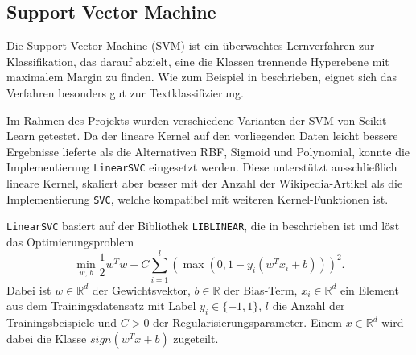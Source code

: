 \subsection{Support Vector Machine}
\label{SVM}

Die Support Vector Machine (SVM) ist ein überwachtes Lernverfahren zur Klassifikation, das darauf abzielt, eine die Klassen trennende Hyperebene mit maximalem Margin zu finden. Wie zum Beispiel in \cite{Joachims1998} beschrieben, eignet sich das Verfahren besonders gut zur Textklassifizierung.

Im Rahmen des Projekts wurden verschiedene Varianten der SVM von Scikit-Learn \cite{Pedregosa2011} getestet. Da der lineare Kernel auf den vorliegenden Daten leicht bessere Ergebnisse lieferte als die Alternativen RBF, Sigmoid und Polynomial, konnte die Implementierung \texttt{LinearSVC} eingesetzt werden. Diese unterstützt ausschließlich lineare Kernel, skaliert aber besser mit der Anzahl der Wikipedia-Artikel als die Implementierung \texttt{SVC}, welche kompatibel mit weiteren Kernel-Funktionen ist.

\texttt{LinearSVC} basiert auf der Bibliothek \texttt{LIBLINEAR}, die in \cite{Fan2008} beschrieben ist und löst das Optimierungsproblem
\begin{equation*}
  \min_{w,\, b} \frac{1}{2} w^T w + C \sum_{i=1}^{l} \left( \max(0, 1 - y_i (w^T x_i + b)) \right)^2.
\end{equation*}
Dabei ist \( w \in \mathbb{R}^d \) der Gewichtsvektor, \( b \in \mathbb{R} \) der Bias-Term, \( x_i \in \mathbb{R}^d \) ein Element aus dem Trainingsdatensatz mit Label \( y_i \in \{-1, 1\} \), \( l \) die Anzahl der Trainingsbeispiele und \( C > 0 \) der Regularisierungsparameter. Einem \( x \in \mathbb{R}^d \) wird dabei die Klasse \( sign(w^T x + b) \) zugeteilt.